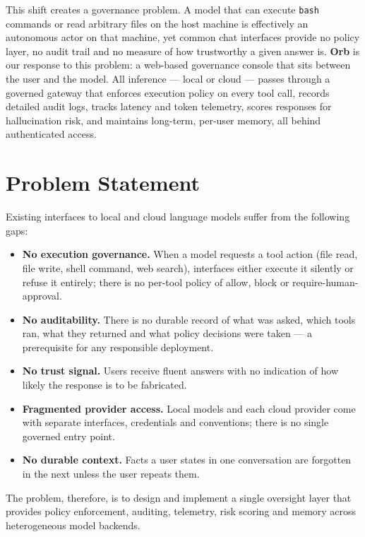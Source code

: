 \documentclass[12pt,a4paper,oneside]{report}
\begin{document}
This shift creates a governance problem. A model that can execute
\texttt{bash} commands or read arbitrary files on the host machine is
effectively an autonomous actor on that machine, yet common chat
interfaces provide no policy layer, no audit trail and no measure of
how trustworthy a given answer is. \textbf{Orb} is our response to
this problem: a web-based governance console that sits between the
user and the model. All inference --- local or cloud --- passes
through a governed gateway that enforces execution policy on every
tool call, records detailed audit logs, tracks latency and token
telemetry, scores responses for hallucination risk, and maintains
long-term, per-user memory, all behind authenticated access.

\section{Problem Statement}
Existing interfaces to local and cloud language models suffer from the
following gaps:
\begin{itemize}
  \item \textbf{No execution governance.} When a model requests a tool
        action (file read, file write, shell command, web search),
        interfaces either execute it silently or refuse it entirely;
        there is no per-tool policy of allow, block or
        require-human-approval.
  \item \textbf{No auditability.} There is no durable record of what
        was asked, which tools ran, what they returned and what policy
        decisions were taken --- a prerequisite for any responsible
        deployment.
  \item \textbf{No trust signal.} Users receive fluent answers with no
        indication of how likely the response is to be fabricated.
  \item \textbf{Fragmented provider access.} Local models and each
        cloud provider come with separate interfaces, credentials and
        conventions; there is no single governed entry point.
  \item \textbf{No durable context.} Facts a user states in one
        conversation are forgotten in the next unless the user repeats
        them.
\end{itemize}
The problem, therefore, is to design and implement a single oversight
layer that provides policy enforcement, auditing, telemetry,
risk scoring and memory across heterogeneous model backends.
\end{document}
